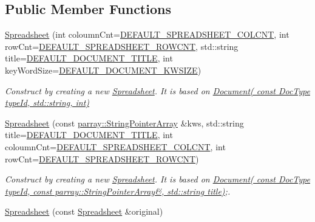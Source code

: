 \subsection*{Public Member Functions}
\begin{DoxyCompactItemize}
\item 
\hypertarget{classdocs_1_1Spreadsheet_ac6e95d685e342630144afaad04c99c74}{\hyperlink{classdocs_1_1Spreadsheet_ac6e95d685e342630144afaad04c99c74}{Spreadsheet} (int coloumn\-Cnt=\hyperlink{namespacedocs_aa40437dd2d0305c57f338406303a3f58}{D\-E\-F\-A\-U\-L\-T\-\_\-\-S\-P\-R\-E\-A\-D\-S\-H\-E\-E\-T\-\_\-\-C\-O\-L\-C\-N\-T}, int row\-Cnt=\hyperlink{namespacedocs_a7562daac15433871b1cc71ad74555032}{D\-E\-F\-A\-U\-L\-T\-\_\-\-S\-P\-R\-E\-A\-D\-S\-H\-E\-E\-T\-\_\-\-R\-O\-W\-C\-N\-T}, std\-::string title=\hyperlink{namespacedocs_a4cf6dd6732c7e7ab7f7855e440485d89}{D\-E\-F\-A\-U\-L\-T\-\_\-\-D\-O\-C\-U\-M\-E\-N\-T\-\_\-\-T\-I\-T\-L\-E}, int key\-Word\-Size=\hyperlink{namespacedocs_ae635b9481a61628036b5a97625856475}{D\-E\-F\-A\-U\-L\-T\-\_\-\-D\-O\-C\-U\-M\-E\-N\-T\-\_\-\-K\-W\-S\-I\-Z\-E})}\label{classdocs_1_1Spreadsheet_ac6e95d685e342630144afaad04c99c74}

\begin{DoxyCompactList}\small\item\em Construct by creating a new \hyperlink{classdocs_1_1Spreadsheet}{Spreadsheet}. It is based on \hyperlink{classdocs_1_1Document_a9f0b2c4c1a3e3344f374330399969e90}{Document( const Doc\-Type type\-Id, std\-::string, int)} \end{DoxyCompactList}\item 
\hypertarget{classdocs_1_1Spreadsheet_a6dae1de9618f2e4226fde62477858e05}{\hyperlink{classdocs_1_1Spreadsheet_a6dae1de9618f2e4226fde62477858e05}{Spreadsheet} (const \hyperlink{classparray_1_1StringPointerArray}{parray\-::\-String\-Pointer\-Array} \&kws, std\-::string title=\hyperlink{namespacedocs_a4cf6dd6732c7e7ab7f7855e440485d89}{D\-E\-F\-A\-U\-L\-T\-\_\-\-D\-O\-C\-U\-M\-E\-N\-T\-\_\-\-T\-I\-T\-L\-E}, int coloumn\-Cnt=\hyperlink{namespacedocs_aa40437dd2d0305c57f338406303a3f58}{D\-E\-F\-A\-U\-L\-T\-\_\-\-S\-P\-R\-E\-A\-D\-S\-H\-E\-E\-T\-\_\-\-C\-O\-L\-C\-N\-T}, int row\-Cnt=\hyperlink{namespacedocs_a7562daac15433871b1cc71ad74555032}{D\-E\-F\-A\-U\-L\-T\-\_\-\-S\-P\-R\-E\-A\-D\-S\-H\-E\-E\-T\-\_\-\-R\-O\-W\-C\-N\-T})}\label{classdocs_1_1Spreadsheet_a6dae1de9618f2e4226fde62477858e05}

\begin{DoxyCompactList}\small\item\em Construct by creating a new \hyperlink{classdocs_1_1Spreadsheet}{Spreadsheet}. It is based on \hyperlink{classdocs_1_1Document_a4a76d0cee2709582e4b9f3b5b8db0277}{Document( const Doc\-Type type\-Id, const parray\-::\-String\-Pointer\-Array\&, std\-::string title)};. \end{DoxyCompactList}\item 
\hypertarget{classdocs_1_1Spreadsheet_a7bbb06aa9261596202f71c65c5400ff2}{\hyperlink{classdocs_1_1Spreadsheet_a7bbb06aa9261596202f71c65c5400ff2}{Spreadsheet} (const \hyperlink{classdocs_1_1Spreadsheet}{Spreadsheet} \&original)}\label{classdocs_1_1Spreadsheet_a7bbb06aa9261596202f71c65c5400ff2}


\end{DoxyCompactItemize}
